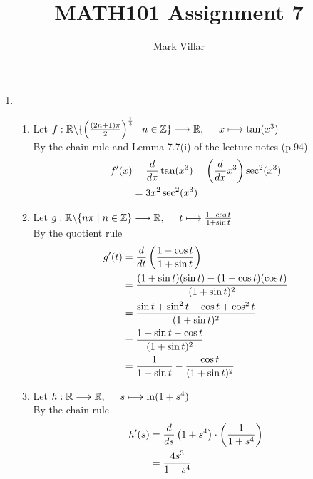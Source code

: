 \documentclass[12pt]{amsart}
\title{MATH101 Assignment 7}
\author{Mark Villar}
\begin{document}
 

\maketitle 

\begin{enumerate}
	
	\item 
	
		\begin{enumerate}
		
			\item Let $f: \mathbb{R} \backslash \{ \left( \frac{(2n+1)\pi}{2} \right)^\frac{1}{3} \mid n \in 
				\mathbb{Z} \} \longrightarrow \mathbb{R}, \hspace{0.5cm} x \longmapsto \tan(x^3)$ \\
				By the chain rule and Lemma 7.7(i) of the lecture notes (p.94)
				\begin{align}
					f'(x) & = \frac{ d}{dx} \tan(x^3) = \left(\frac{ d}{dx} x^3 \right) \sec^2(x^3) \notag \\
					& = 3x^2 \sec^2(x^3) \notag
				\end{align}
			
			\item Let $g:  \mathbb{R} \backslash \{n\pi \mid n \in \mathbb{Z} \} \longrightarrow \mathbb{R},
				\hspace{0.5cm} t \longmapsto \frac{1-\cos t}{1+\sin t}$ \\
				By the quotient rule
				\begin{align}
					g'(t) & = \frac{ d}{dt}\left(\frac{1-\cos t}{1+\sin t}\right) \notag \\
					& = \frac{(1+\sin t)(\sin t) - (1-\cos t)(\cos t)}{(1+\sin t)^2} \notag \\
					& = \frac{\sin t + \sin^2 t -\cos t + \cos^2 t}{(1+\sin t)^2} \notag \\
					& = \frac{1+\sin t - \cos t}{(1+\sin t)^2} \notag \\
					& = \frac{1}{1+\sin t} -\frac{\cos t}{(1+\sin t)^2} \notag
				\end{align}
			
			\item Let $h:\mathbb{R}\longrightarrow\mathbb{R},\hspace{0.5cm} s\longmapsto \ln(1+s^4)$ \\
				By the chain rule
				\begin{align}
					h'(s) & = \frac{ d}{ds} \left(1+s^4\right) \cdot \left(\frac{1}{1+s^4}\right) \notag \\
					& = \frac{4s^3}{1+s^4} \notag
				\end{align}
				

\end{enumerate}
\end{enumerate}
\end{document}

